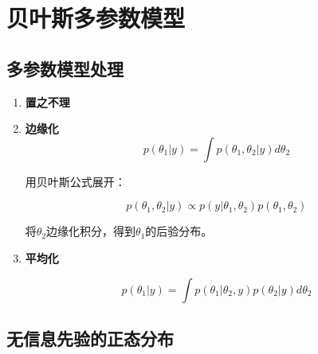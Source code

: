 \section{贝叶斯多参数模型}
\subsection{多参数模型处理}

\begin{enumerate}
\def\labelenumi{\arabic{enumi}.}
\item
  \textbf{置之不理}
\item
  \textbf{边缘化}
\begin{equation}
  p(\theta_1|y)=\int p(\theta_1,\theta_2|y)d\theta_2
\end{equation}
  
  用贝叶斯公式展开：

  \[p(\theta_1,\theta_2|y)\propto p(y|\theta_1,\theta_2)p(\theta_1,\theta_2)\]

  将\(\theta_2\)边缘化积分，得到\(\theta_1\)的后验分布。
\item
  \textbf{平均化}

  \[p(\theta_1|y)=\int p(\theta_1|\theta_2,y)p(\theta_2|y)d\theta_2\]
\end{enumerate}

\subsection{无信息先验的正态分布}

